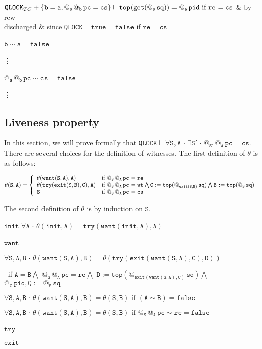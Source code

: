 \documentclass{article}
\makeatletter
\newcommand{\Q}{\mathtt{Q}}
\newcommand{\B}{\mathtt{B}}
\newcommand{\A}{\mathtt{A}}
\newcommand{\C}{\mathtt{C}}
\newcommand{\D}{\mathtt{D}}
\renewcommand{\S}{\mathtt{S}}
\renewcommand{\a}{{\mathtt{a}}}
\renewcommand{\b}{{\mathtt{b}}}
\newcommand{\s}{{\mathtt{s}}}
\newcommand{\pc}{{\mathtt{pc}}}
\newcommand{\pid}{{\mathtt{pid}}}
\newcommand{\sq}{{\mathtt{sq}}}
\newcommand{\re}{{\mathtt{re}}}
\newcommand{\wt}{{\mathtt{wt}}}
\newcommand{\cs}{{\mathtt{cs}}}
\newcommand{\QLOCK}{{\mathtt{QLOCK}}}
\newcommand{\Top}{{\mathtt{top}}}
\newcommand{\false}{{\mathtt{false}}}
\newcommand{\true}{{\mathtt{true}}}
\newcommand{\init}{{\mathtt{init}}}
\newcommand{\want}{{\mathtt{want}}}
\newcommand{\try}{{\mathtt{try}}}
\newcommand{\exit}{{\mathtt{exit}}}
\newcommand{\get}{{\mathtt{get}}}
\newcommand{\at}[1]{@_{#1}\,}
\newcommand{\Forall}[1]{\forall #1\,{\cdot}\,}
\newcommand{\Exists}[1]{\exists #1\,{\cdot}\,}
\makeatother
\begin{document}
\begin{proofcases}[itemsep=1ex]
\begin{proofcases}[itemsep=1ex]
\begin{proofsteps}{30em}
      $\QLOCK_{TC}+\{ \b=\a, \at{\s}\at{\b}\pc =\cs \}\vdash \newline
      \Top( \get(\at{\s}\sq))=\at{\a}\pid \text{ if } \re =\cs$ & by rew  \\
      
      discharged & since $\QLOCK\vdash \true =\false \text{ if } \re=\cs$  
     \end{proofsteps}
     
      \item[ $\b \sim \a =\false$ ] \
      
      \vdots
      
      \item [ $\at{\s}\at{\b}\pc\sim \cs =\false$ ] \
      
      \vdots
 \end{proofcases}
 \end{proofcases}
 
 \subsection{Liveness property}
 In this section, we will prove formally that
 $\QLOCK\vdash \Forall{\S,\A}\Exists{\S'}\at{\S'}\at{\A}\pc=\cs$.
 There are several choices for the definition of witnesses. 
 The first definition of $\theta$ is as follows: 
 
$\theta(\S,\A)=\left\{\begin{array}{l l}
 \theta(\want(\S,\A),\A) & \text{if } \at{\S}\at{\A}\pc =\re\\
 \theta(\try(\exit(\S,\B),\C),\A) & \text{if } \at{\S}\at{\A}\pc =\wt \bigwedge \C:= \Top(\at{\exit(\S,\B)}\sq) \bigwedge \B:= \Top(\at{\S} \sq) \\
 \S & \text{if } \at{\S}\at{\A}\pc=\cs
\end{array}\right.$

The second definition of $\theta$ is by induction on $\S$.
\begin{proofcases}[itemsep=1ex]
 \item[$\init$] 
  $\Forall{\A}\theta(\init,\A)=\try(\want(\init,\A),\A)$
 \item[$\want$] \
 
  $\Forall{\S,\A,\B}\theta(\want(\S,\A),\B)=
  \theta(\try(\exit(\want(\S,\A),\C),\D))$ 
   
  $\ $ if
  $\A=\B \bigwedge$
  $\at{\S}\at{\A}\pc =\re \bigwedge$
  $\D:=\Top(\at{\exit(\want(\S,\A),\C)}\sq)\bigwedge$ 
  $\at{\C}\pid,\Q:=\at{\S}\sq$
 
 $\Forall{\S,\A,\B}\theta(\want(\S,\A),\B)=\theta(\S,\B) \text{ if }(\A\sim\B)=\false$
 
 $\Forall{\S,\A,\B}\theta(\want(\S,\A),\B)=\theta(\S,\B) \text{ if }\at{\S}\at{\A}\pc\sim\re=\false$
 
 \item[$\try$]\
 
 \item[$\exit$]
\end{proofcases}
\end{document}
